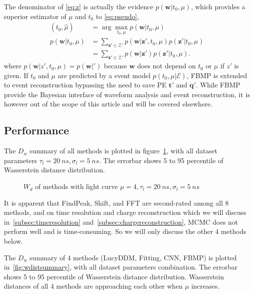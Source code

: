 The denominator of \eqref{eq:z} is actually the evidence $p(\bm{w}|t_0, \mu)$, which provides a superior estimator of $\mu$ and $t_0$ to \eqref{eq:pseudo},
\begin{equation}
\begin{aligned}
    \label{eq:bayesianinter}
    \left(\hat{t}_0, \hat{\mu}\right) &= \arg\underset{t_0,\mu}{\max} p(\bm{w} | t_0, \mu) \\
    p(\bm{w}|t_0, \mu) &= \sum_{\bm{z}'\in\mathcal{Z}'}p(\bm{w}|\bm{z}',t_0,\mu)p(\bm{z}'|t_0,\mu) \\
    &= \sum_{\bm{z}'\in\mathcal{Z}'}p(\bm{w}|\bm{z}')p(\bm{z}'|t_0,\mu).
\end{aligned}
\end{equation}
where $p(\bm{w}|z', t_0, \mu) = p(\bm{w}|')$ because $\bm{w}$ does not depend on $t_0$ or $\mu$ if $z'$ is given.  If $t_0$ and $\mu$ are predicted by a event model $p(t_0, \mu | \mathcal{E})$, FBMP is extended to event reconstruction bypassing the need to save PE $\bm{t}'$ and $\bm{q}'$.  While FBMP provide the Bayesian interface of waveform analysis and event reconstruction, it is however out of the scope of this article and will be covered elsewhere.

\subsection{Performance}


The $D_w$ summary of all methods is plotted in figure~\ref{fig:chargesummary}, with all dataset parameters $\tau_l=\SI{20}{ns}, \sigma_l=\SI{5}{ns}$. The errorbar shows 5 to 95 percentile of Wasserstein distance distribution. 

\begin{figure}[H]
    \centering
    \scalebox{0.6}{}
    \caption{\label{fig:chargesummary} $W_{d}$ of methods with light curve $\mu=4, \tau_l=\SI{20}{ns}, \sigma_l=\SI{5}{ns}$}
\end{figure}

It is apparent that FindPeak, Shift, and FFT are second-rated among all 8 methods, and on time resolution and charge reconstruction which we will discuss in~\ref{subsec:timeresolution} and~\ref{subsec:chargereconstruction}, MCMC does not perform well and is time-consuming. So we will only discuss the other 4 methods below. 


The $D_w$ summary of 4 methods (LucyDDM, Fitting, CNN, FBMP) is plotted in~\ref{fig:wdistsummary}, with all dataset parameters combination. The errorbar shows 5 to 95 percentile of Wasserstein distance distribution. Wasserstein distances of all 4 methods are approaching each other when $\mu$ increases. 

